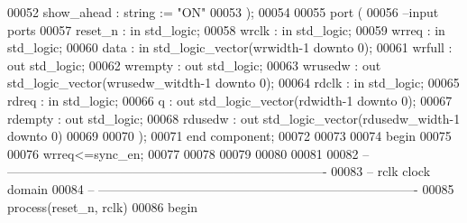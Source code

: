 \begin{DoxyCode}
00052           show_ahead      : \textcolor{comment}{string}  := \textcolor{keyword}{"ON"}
00053   );  
00054 
00055   \textcolor{keywordflow}{port} (
00056 \textcolor{keyword}{      --input ports }
00057       reset_n       : \textcolor{keywordflow}{in} \textcolor{comment}{std\_logic};
00058       wrclk         : \textcolor{keywordflow}{in} \textcolor{comment}{std\_logic};
00059       wrreq         : \textcolor{keywordflow}{in} \textcolor{comment}{std\_logic};
00060       data          : \textcolor{keywordflow}{in} \textcolor{comment}{std\_logic\_vector}(wrwidth\textcolor{vhdlchar}{-}\textcolor{vhdllogic}{}\textcolor{vhdllogic}{1} \textcolor{keywordflow}{downto} \textcolor{vhdllogic}{}\textcolor{vhdllogic}{0});
00061       wrfull        : \textcolor{keywordflow}{out} \textcolor{comment}{std\_logic};
00062         wrempty       : \textcolor{keywordflow}{out} \textcolor{comment}{std\_logic};
00063       wrusedw       : \textcolor{keywordflow}{out} \textcolor{comment}{std\_logic\_vector}(wrusedw_witdth\textcolor{vhdlchar}{-}\textcolor{vhdllogic}{}\textcolor{vhdllogic}{1} \textcolor{keywordflow}{downto} \textcolor{vhdllogic}{}\textcolor{vhdllogic}{0});
00064       rdclk          : \textcolor{keywordflow}{in} \textcolor{comment}{std\_logic};
00065       rdreq         : \textcolor{keywordflow}{in} \textcolor{comment}{std\_logic};
00066       q             : \textcolor{keywordflow}{out} \textcolor{comment}{std\_logic\_vector}(rdwidth\textcolor{vhdlchar}{-}\textcolor{vhdllogic}{}\textcolor{vhdllogic}{1} \textcolor{keywordflow}{downto} \textcolor{vhdllogic}{}\textcolor{vhdllogic}{0});
00067       rdempty       : \textcolor{keywordflow}{out} \textcolor{comment}{std\_logic};
00068       rdusedw       : \textcolor{keywordflow}{out} \textcolor{comment}{std\_logic\_vector}(rdusedw_width\textcolor{vhdlchar}{-}\textcolor{vhdllogic}{}\textcolor{vhdllogic}{1} \textcolor{keywordflow}{downto} \textcolor{vhdllogic}{}\textcolor{vhdllogic}{0})     
00069         
00070         );
00071 \textcolor{keywordflow}{end} \textcolor{keywordflow}{component};
00072 
00073   
00074 \textcolor{vhdlkeyword}{begin}
00075 
00076 \textcolor{vhdlchar}{wrreq}\textcolor{vhdlchar}{<=}\textcolor{vhdlchar}{sync_en}; 
00077 
00078 
00079   
00080 
00081 
00082 \textcolor{keyword}{-- ----------------------------------------------------------------------------}
00083 \textcolor{keyword}{-- rclk clock domain}
00084 \textcolor{keyword}{-- ----------------------------------------------------------------------------}
00085   \textcolor{keywordflow}{process}(reset_n, rclk)
00086 \textcolor{vhdlkeyword}{    begin}

\end{DoxyCode}
